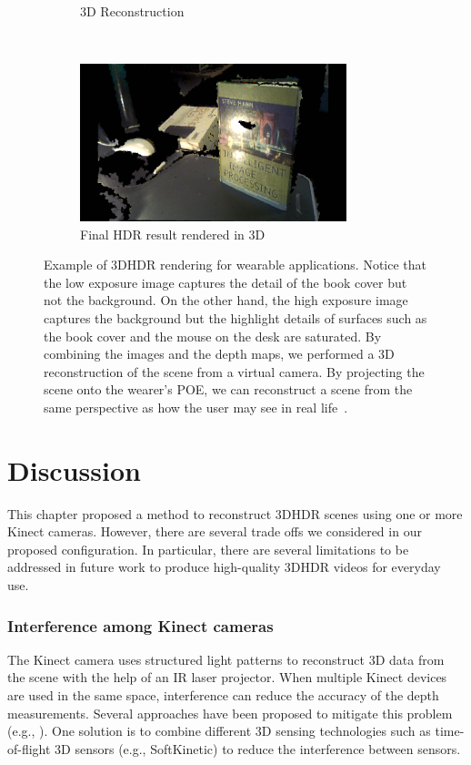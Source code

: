 \begin{figure}[t!]
\begin{subfigure}{0.4\textwidth}
        \caption{3D Reconstruction}
        \label{hdr_result1}
    \end{subfigure}
    ~
    \begin{subfigure}{0.55\textwidth}
	\centering	
	\includegraphics[height=1.8in]{ch4/diagrams/hdr_results/hdr.jpg}
	\caption{Final HDR result rendered in 3D}
	\label{hdr_result2}
    \end{subfigure}
    
    \caption{Example of 3DHDR rendering for wearable applications. Notice that the low exposure image captures the detail of the book cover but not the background. On the other hand, the high exposure image captures the background but the highlight details of surfaces such as the book cover and the mouse on the desk are saturated. By combining the images and the depth maps, we performed a 3D reconstruction of the scene from a virtual camera. By projecting the scene onto the wearer's POE, we can reconstruct a scene from the same perspective as how the user may see in real life~\cite{lo2013three}.}
\label{fig_3D_HDR_results}
\end{figure}

\section{Discussion}
\label{sec_discussion}
This chapter proposed a method to reconstruct 3DHDR scenes using one or more Kinect cameras. However, there are several trade offs we considered in our proposed configuration. In particular, there are several limitations to be addressed in future work to produce high-quality 3DHDR videos for everyday use.

\subsubsection{Interference among Kinect cameras}
The Kinect camera uses structured light patterns to reconstruct 3D data from the scene with the help of an IR laser projector. When multiple Kinect devices are used in the same space, interference can reduce the accuracy of the depth measurements. Several approaches have been proposed to mitigate this problem (e.g., \cite{maimone2012reducing}). One solution is to combine different 3D sensing technologies such as time-of-flight 3D sensors (e.g., SoftKinetic) to reduce the interference between sensors. 

